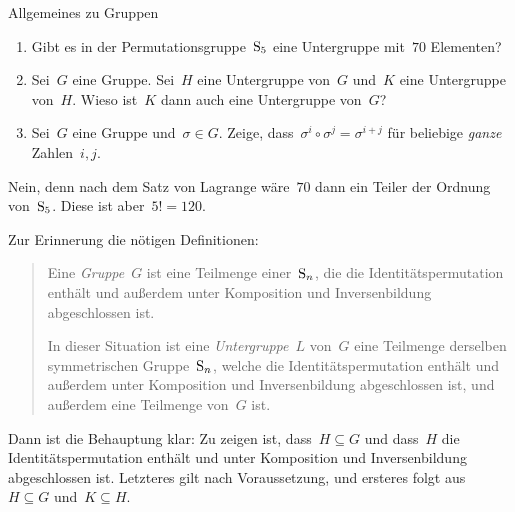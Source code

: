 \documentclass{algblatt}
\begin{document}
\vspace*{-1.5cm}

\begin{aufgabe}{Allgemeines zu Gruppen}
\begin{enumerate}
\item Gibt es in der Permutationsgruppe~$\mathrm{S}_5$ eine Untergruppe mit~$70$
Elementen?

\item Sei~$G$ eine Gruppe. Sei~$H$ eine Untergruppe von~$G$ und~$K$ eine
Untergruppe von~$H$. Wieso ist~$K$ dann auch eine Untergruppe von~$G$?

\item Sei~$G$ eine Gruppe und~$\sigma \in G$. Zeige, dass~$\sigma^i \circ
\sigma^j = \sigma^{i + j}$ für beliebige \emph{ganze} Zahlen~$i,j$.
\end{enumerate}

\begin{loesungE}
\item Nein, denn nach dem Satz von Lagrange wäre~$70$ dann ein Teiler der
Ordnung von~$\mathrm{S}_5$. Diese ist aber~$5! = 120$.

\item Zur Erinnerung die nötigen Definitionen:
\begin{quote}
  Eine \emph{Gruppe}~$G$ ist eine Teilmenge einer~$\mathrm{S}_n$, die die
  Identitätspermutation enthält und außerdem unter
  Komposition und Inversenbildung abgeschlossen ist.

  In dieser Situation ist eine \emph{Untergruppe}~$L$ von~$G$ eine
  Teilmenge derselben symmetrischen Gruppe~$\mathrm{S}_n$, welche die 
  Identitätspermutation enthält und außerdem unter
  Komposition und Inversenbildung abgeschlossen ist, und außerdem eine
  Teilmenge von~$G$ ist.
\end{quote}
Dann ist die Behauptung klar: Zu zeigen ist, dass~$H \subseteq G$ und dass~$H$
die Identitätspermutation enthält und unter Komposition und Inversenbildung
abgeschlossen ist. Letzteres gilt nach Voraussetzung, und ersteres folgt aus~$H
\subseteq G$ und~$K \subseteq H$.
\end{loesungE}
\end{aufgabe}
\end{document}
